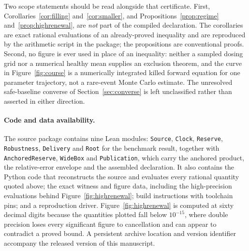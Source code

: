 Two scope statements should be read alongside that certificate. First, Corollaries~\ref{cor:filling} and~\ref{cor:smaller}, and Propositions~\ref{prop:regime} and~\ref{prop:highrenewal}, are \emph{not} part of the compiled declaration. The corollaries are exact rational evaluations of an already-proved inequality and are reproduced by the arithmetic script in the package; the propositions are conventional proofs. Second, no figure is ever used in place of an inequality: neither a sampled dosing grid nor a numerical healthy mean supplies an exclusion theorem, and the curve in Figure~\ref{fig:course} is a numerically integrated killed forward equation for one parameter trajectory, not a rare-event Monte Carlo estimate. The unresolved safe-baseline converse of Section~\ref{sec:converse} is left unclassified rather than asserted in either direction.

\paragraph{Code and data availability.}
The source package contains nine Lean modules: \texttt{Source}, \texttt{Clock}, \texttt{Reserve}, \texttt{Robustness}, \texttt{Delivery} and \texttt{Root} for the benchmark result, together with \texttt{AnchoredReserve}, \texttt{WideBox} and \texttt{Publication}, which carry the anchored product, the relative-error envelope and the assembled declaration. It also contains the Python code that reconstructs the source and evaluates every rational quantity quoted above; the exact witness and figure data, including the high-precision evaluations behind Figure~\ref{fig:highrenewal}; build instructions with toolchain pins; and a reproduction driver. Figure~\ref{fig:highrenewal} is computed at sixty decimal digits because the quantities plotted fall below $10^{-15}$, where double precision loses every significant figure to cancellation and can appear to contradict a proved bound. A persistent archive location and version identifier accompany the released version of this manuscript.
